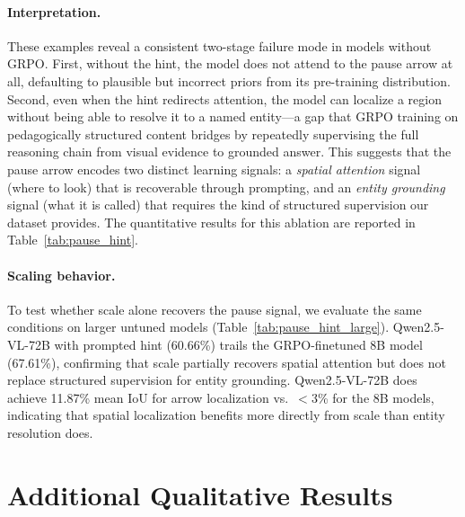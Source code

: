 \documentclass{article}
\begin{document}
\paragraph{Interpretation.}
These examples reveal a consistent two-stage failure mode in models without GRPO.
First, without the hint, the model does not attend to the pause arrow at all, defaulting
to plausible but incorrect priors from its pre-training distribution.
Second, even when the hint redirects attention, the model can localize a region without
being able to resolve it to a named entity---a gap that GRPO training on pedagogically
structured content bridges by repeatedly supervising the full reasoning chain from
visual evidence to grounded answer.
This suggests that the pause arrow encodes two distinct learning signals: a
\textit{spatial attention} signal (where to look) that is recoverable through prompting,
and an \textit{entity grounding} signal (what it is called) that requires the kind of
structured supervision our dataset provides.
The quantitative results for this ablation are reported in Table~\ref{tab:pause_hint}.

\pausehintquality  %

\paragraph{Scaling behavior.}
To test whether scale alone recovers the pause signal, we evaluate the same
conditions on larger untuned models (Table~\ref{tab:pause_hint_large}).
Qwen2.5-VL-72B with prompted hint (60.66\%) trails the GRPO-finetuned 8B
model (67.61\%), confirming that scale partially recovers spatial attention
but does not replace structured supervision for entity grounding.
Qwen2.5-VL-72B does achieve 11.87\% mean IoU for arrow localization vs.\
$<$3\% for the 8B models, indicating that spatial localization benefits more
directly from scale than entity resolution does.

\pausehintlargetable
\localizationtable
\section{Additional Qualitative Results}
\label{sec:additional_qualitative}
\end{document}
